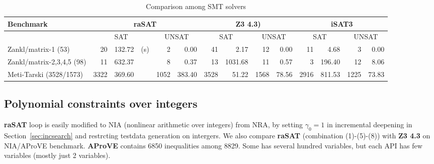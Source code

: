 \begin{table*}[t]
\centering
\begin{tabular}{ | l | r | r  r | r | r  | r | r | r | r | r | r |r | r |}
\hline
    \multicolumn{1}{|l|}{Benchmark} & 
    \multicolumn{5}{c|}{\bf raSAT} & \multicolumn{4}{c|}{\bf Z3 4.3)} & \multicolumn{4}{c|}{\bf iSAT3} \\
\hline
    & \multicolumn{3}{|c|}{SAT} & \multicolumn{2}{|c|}{UNSAT} & \multicolumn{2}{|c|}{SAT} 
    & \multicolumn{2}{|c|}{UNSAT} & \multicolumn{2}{|c|}{SAT} & \multicolumn{2}{|c|}{UNSAT} \\
\hline
Zankl/matrix-1 (53) & 20 & 132.72 & (s) & 2 & 0.00 & 41 & 2.17 & 12 & 0.00 & 11 & 4.68 & 3 & 0.00 \\
\hline
Zankl/matrix-2,3,4,5 (98) & 11 & 632.37 && 8 & 0.37 & 13 & 1031.68 & 11 & 0.57 & 3 & 196.40 & 12 & 8.06 \\
\hline 
Meti-Tarski (3528/1573) & 3322 & 369.60 && 1052 & 383.40 & 3528 & 51.22 & 1568 & 78.56 & 2916 & 811.53 & 
1225 & 73.83 \\
\hline
\end{tabular}
\medskip 
\caption{Comparison among SMT solvers} \label{tab:comparison}
\end{table*}



\subsection{Polynomial constraints over integers} \label{sec:NIA}

{\bf raSAT} loop is easily modified to NIA (nonlinear arithmetic over integers) from NRA, 
by setting $\gamma_0 = 1$ in incremental deepening in Section~\ref{sec:incsearch} 
and restrcting testdata generation on intergers. 
We also compare {\bf raSAT} (combination (1)-(5)-(8)) with {\bf Z3 4.3} on NIA/AProVE benchmark. 
{\bf AProVE} contains 6850 inequalities among 8829. 
Some has several hundred variables, but each API has few variables (mostly just 2 variables). 


